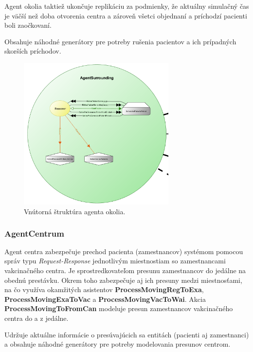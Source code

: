 \documentclass[letterpaper]{article}
\begin{document}
	Agent okolia taktiež ukončuje replikáciu za podmienky, že aktuálny simulačný čas je väčší než doba otvorenia centra a zároveň všetci objednaní a príchodzí pacienti boli zaočkovaní.
	
	Obsahuje náhodné generátory pre potreby rušenia pacientov a ich prípadných skorších príchodov.
	
	\vspace{0.8cm}
	
	\begin{figure}[hbt!]
		\centering
		\includegraphics[width=0.7\textwidth]{src/AgentSurrounding}
		\caption{Vnútorná štruktúra agenta okolia.}
	\end{figure}
	
	\newpage
	
	\subsubsection{AgentCentrum}
	
	Agent centra zabezpečuje prechod pacienta (zamestnancov) systémom pomocou správ typu \textit{Request-Response} jednotlivým miestnostiam so zamestnancami vakcinačného centra. Je sprostredkovateľom presunu zamestnancov do jedálne na obednú prestávku. Okrem toho zabezpečuje aj ich presuny medzi miestnosťami, na čo využíva okamžitých asistentov \textbf{ProcessMovingRegToExa}, \textbf{ProcessMovingExaToVac} a \textbf{ProcessMovingVacToWai}. Akcia \textbf{ProcessMovingToFromCan} modeluje presun zamestnancov vakcinačného centra do a z jedálne.
	
	Udržuje aktuálne informácie o presúvajúcich sa entitách (pacienti aj zamestnanci) a obsahuje náhodné generátory pre potreby modelovania presunov centrom.
	
\end{document}
